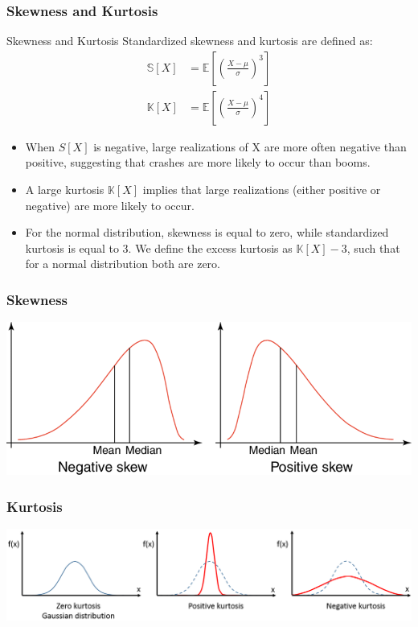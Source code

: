 \documentclass[xcolor=dvipsnames, english, 8pt]{beamer}
\begin{document}
\begin{frame}
    \frametitle{Skewness and Kurtosis}
    \begin{block}{Skewness and Kurtosis}
Standardized skewness and kurtosis are defined as:
\begin{align}
    \mathbb{S}[X] &= \mathbb{E} \left[\left(\frac{X-\mu}{\sigma}\right)^3\right] \\
    \mathbb{K}[X] &= \mathbb{E} \left[\left(\frac{X-\mu}{\sigma}\right)^4\right]
\end{align}
\end{block}
\begin{itemize}
\item When $S[X]$ is negative, large realizations of X are more often negative than positive, suggesting that crashes are more likely to occur than booms.
\item A large kurtosis $\mathbb{K}[X]$ implies that large realizations (either positive or negative) are more likely to occur.
\item For the normal distribution, skewness is equal to zero, while standardized kurtosis is equal to 3. We define the excess kurtosis as $\mathbb{K}[X]-3$, such that for a normal distribution both are zero.
\end{itemize}
\end{frame}

\begin{frame}
    \frametitle{Skewness}
\begin{center}
    \includegraphics[scale=0.35]{skew}
\end{center}
\end{frame}


\begin{frame}
    \frametitle{Kurtosis}
\begin{center}
    \includegraphics[scale=0.35]{kurt}
\end{center}
\end{frame}
\end{document}

